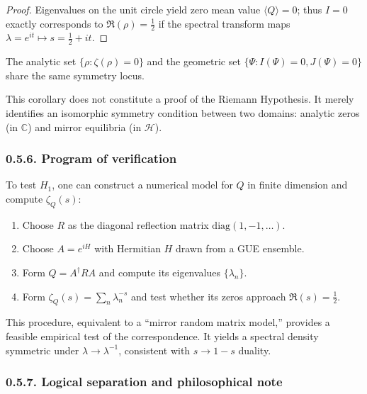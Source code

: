\begin{proof}
Eigenvalues on the unit circle yield zero mean value $\langle Q\rangle=0$;
thus $I=0$ exactly corresponds to $\Re(\rho)=\tfrac12$ if the spectral transform maps $\lambda=e^{it}\mapsto s=\tfrac12+it$.
\end{proof}

\begin{corollary}
The analytic set $\{\rho:\zeta(\rho)=0\}$ and the geometric set $\{\Psi:I(\Psi)=0,J(\Psi)=0\}$ share the same symmetry locus.
\end{corollary}

\begin{remark}
This corollary does not constitute a proof of the Riemann Hypothesis.
It merely identifies an isomorphic symmetry condition between two domains:
analytic zeros (in $\mathbb{C}$) and mirror equilibria (in $\mathcal{H}$).
\end{remark}

\subsubsection*{0.5.6. Program of verification}

To test $H_1$, one can construct a numerical model for $Q$ in finite dimension and compute $\zeta_Q(s)$:

\begin{enumerate}
\item Choose $R$ as the diagonal reflection matrix $\mathrm{diag}(1,-1,\dots)$.
\item Choose $A=e^{iH}$ with Hermitian $H$ drawn from a GUE ensemble.
\item Form $Q=A^\dagger R A$ and compute its eigenvalues $\{\lambda_n\}$.
\item Form $\zeta_Q(s)=\sum_n\lambda_n^{-s}$ and test whether its zeros approach $\Re(s)=\tfrac12$.
\end{enumerate}

\begin{remark}
This procedure, equivalent to a “mirror random matrix model,”
provides a feasible empirical test of the correspondence.
It yields a spectral density symmetric under $\lambda\to\lambda^{-1}$, 
consistent with $s\to1-s$ duality.
\end{remark}

\subsubsection*{0.5.7. Logical separation and philosophical note}

